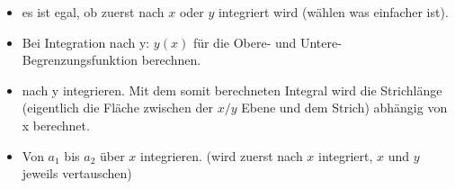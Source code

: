 \begin{itemize}
	\item es ist egal, ob zuerst nach $x$ oder $y$ integriert wird (wählen was einfacher ist).
	\item Bei Integration nach y: $y(x)$ für die Obere- und Untere- Begrenzungsfunktion berechnen.
	\item nach y integrieren. Mit dem somit berechneten Integral wird die \grqq Strichlänge \grqq{} (eigentlich die Fläche zwischen der $x/y$ Ebene und dem Strich) abhängig von x berechnet.
	\item Von $a_1$ bis $a_2$ über $x$ integrieren. (wird zuerst nach $x$ integriert, $x$ und $y$ jeweils vertauschen)
\end{itemize}